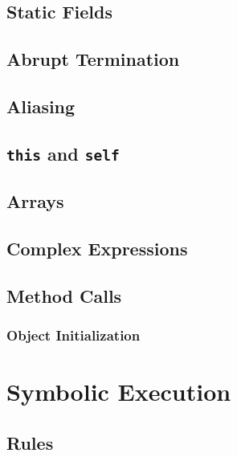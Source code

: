 \documentclass[a4paper, 11pt, accentcolor = tud3b]{tudreport}
\begin{document}
			\subsection{Static Fields} %

			\subsection{Abrupt Termination} %

			\subsection{Aliasing} %

			\subsection{\texttt{this} and \texttt{self}} %

			\subsection{Arrays} %

			\subsection{Complex Expressions} %

			\subsection{Method Calls} %

				\subsubsection{Object Initialization} %

		\section{Symbolic Execution} %

			\subsection{Rules} %
\end{document}
